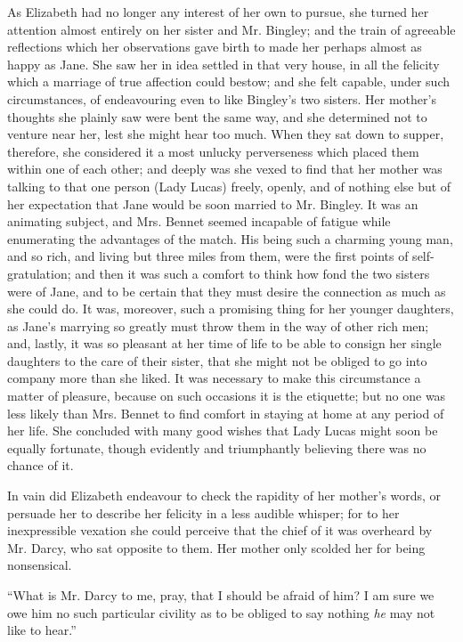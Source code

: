 \documentclass[12pt]{book}
\begin{document}
As Elizabeth had no longer any interest of her own to pursue, she turned her attention almost entirely on her sister and Mr. Bingley; and the train of agreeable reflections which her observations gave birth to made her perhaps almost as happy as Jane. She saw her in idea settled in that very house, in all the felicity which a marriage of true affection could bestow; and she felt capable, under such circumstances, of endeavouring even to like Bingley's two sisters. Her mother's thoughts she plainly saw were bent the same way, and she determined not to venture near her, lest she might hear too much. When they sat down to supper, therefore, she considered it a most unlucky perverseness which placed them within one of each other; and deeply was she vexed to find that her mother was talking to that one person (Lady Lucas) freely, openly, and of nothing else but of her expectation that Jane would be soon married to Mr. Bingley. It was an animating subject, and Mrs. Bennet seemed incapable of fatigue while enumerating the advantages of the match. His being such a charming young man, and so rich, and living but three miles from them, were the first points of self-gratulation; and then it was such a comfort to think how fond the two sisters were of Jane, and to be certain that they must desire the connection as much as she could do. It was, moreover, such a promising thing for her younger daughters, as Jane's marrying so greatly must throw them in the way of other rich men; and, lastly, it was so pleasant at her time of life to be able to consign her single daughters to the care of their sister, that she might not be obliged to go into company more than she liked. It was necessary to make this circumstance a matter of pleasure, because on such occasions it is the etiquette; but no one was less likely than Mrs. Bennet to find comfort in staying at home at any period of her life. She concluded with many good wishes that Lady Lucas might soon be equally fortunate, though evidently and triumphantly believing there was no chance of it.

In vain did Elizabeth endeavour to check the rapidity of her mother's words, or persuade her to describe her felicity in a less audible whisper; for to her inexpressible vexation she could perceive that the chief of it was overheard by Mr. Darcy, who sat opposite to them. Her mother only scolded her for being nonsensical.

``What is Mr. Darcy to me, pray, that I should be afraid of him? I am sure we owe him no such particular civility as to be obliged to say nothing \textit{he} may not like to hear.''
\end{document}
